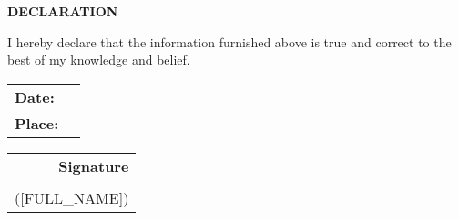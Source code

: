 \documentclass[11pt,a4paper]{article}
\newcommand{\biosection}[1]{
    \vspace{0.4cm}
    \noindent\textbf{#1}
    \vspace{0.2cm}
}
\begin{document}
\vspace{1cm}
\biosection{DECLARATION}

I hereby declare that the information furnished above is true and correct to the best of my knowledge and belief.

\vspace{1.5cm}

\begin{tabular}{ll}
\textbf{Date:} & \underline{\hspace{3cm}} \\
\textbf{Place:} & \underline{\hspace{3cm}} \\
\end{tabular}

\hfill

\begin{tabular}{r}
\textbf{Signature} \\
\underline{\hspace{4cm}} \\
([FULL_NAME])
\end{tabular}
\end{document}

